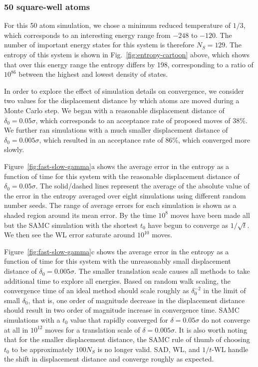 \documentclass[letterpaper,twocolumn,amsmath,amssymb,pre,aps,10pt]{revtex4-1}
\begin{document}
\subsubsection{50 square-well atoms}
For this 50 atom simulation, we chose a minimum reduced
temperature of $1/3$, which corresponds to an interesting energy range
from $-248$ to $-120$.  The number of important energy states
for this system is therefore $N_S = 129$.  The entropy of this system is shown in
Fig.~\ref{fig:entropy-cartoon} above, which shows that over this
energy range the entropy differs by 198, corresponding to a ratio of
$10^{86}$ between the highest and lowest density of states.

In order to explore the effect of simulation details on convergence,
we consider two values for the displacement distance by which atoms
are moved during a Monte Carlo step.  We began with a reasonable
displacement distance of $\delta_0 = 0.05\sigma$, which corresponds to
an acceptance rate of proposed moves of 38\%.  We further ran
simulations with a much smaller displacement distance of $\delta_0 =
0.005\sigma$, which resulted in an acceptance rate of 86\%, which
converged more slowly.

Figure~\ref{fig:fast-slow-gamma}a shows the average error in the
entropy as a function of time for this system with the reasonable
displacement distance of $\delta_0 = 0.05\sigma$.  The solid/dashed lines
represent the average of the absolute value of the error in the
entropy averaged over eight simulations using different random number
seeds.  The range of average errors for each simulation is shown as a
shaded region around its mean error.  By the time $10^8$ moves have
been made all but the SAMC simulation with the shortest $t_0$ have
begun to converge as $1/\sqrt{t}$.  We then see the WL error
saturate around $10^{10}$ moves.

Figure~\ref{fig:fast-slow-gamma}c shows the average error in
the entropy as a function of time for this system with the
unreasonably small displacement distance of $\delta_0 = 0.005\sigma$.
%
The smaller translation scale causes all methods to take additional time to
explore all energies. Based on random walk scaling, the convergence time of an
ideal method should scale roughly as $\delta_0^{-2}$ in the limit of small
$\delta_0$, that is, one order of magnitude decrease in the displacement
distance should result in two order of magnitude increase in convergence time.
SAMC simulations with a $t_0$ value that rapidly converged for $\delta =
0.05\sigma$ do not converge at all in $10^{12}$ moves for a translation scale of
$\delta = 0.005\sigma$. It is also worth noting that for the smaller
displacement distance, the SAMC rule of thumb of choosing $t_0$ to be
approximately $100N_S$ is no longer valid. SAD, WL, and $1/t$-WL handle the
shift in displacement distance and converge roughly as expected.
\end{document}
